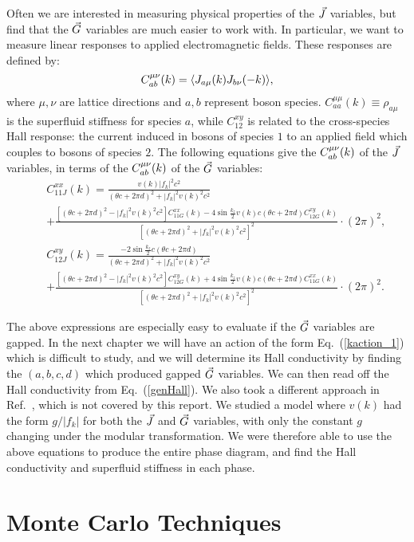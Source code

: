 Often we are interested in measuring physical properties of the $\vec{J}$ variables, but find that the $\vec{G}$ variables are much easier to work with. In particular, we want to measure linear responses to applied electromagnetic fields. These responses are defined by:
\begin{equation}
C^{\mu\nu}_{ab}(k)=\langle J_{a\mu}(k) J_{b\nu}(-k)\rangle,
\end{equation}
where $\mu,\nu$ are lattice directions and $a,b$ represent boson species. $C^{\mu\mu}_{aa}(k)\equiv \rho_{a\mu}$ is the superfluid stiffness for species $a$, while $C^{xy}_{12}$ is related to the cross-species Hall response: the current induced in bosons of species $1$ to an applied field which couples to bosons of species $2$. The following equations give the $C^{\mu\nu}_{ab}(k)$ of the $\vec{J}$ variables, in terms of the $C^{\mu\nu}_{ab}(k)$ of the $\vec{G}$ variables:
\begin{eqnarray}
&&C_{11J}^{xx}(k)=\frac{v(k)|f_k|^2c^2}{(\theta c+2\pi d)^2+|f_k|^2v(k)^2c^2}\\
&&+\frac{[(\theta c+2\pi d)^2-|f_k|^2v(k)^2c^2]C_{11G}^{xx}(k)-4\sin{\frac{k_z}{2}}v(k)c(\theta c+2\pi d)C_{12G}^{xy}(k)}{[(\theta c+2\pi d)^2+|f_k|^2v(k)^2c^2]^2}\cdot (2\pi)^2,\nonumber\\
&&C_{12J}^{xy}(k)=\frac{-2\sin{\frac{k_z}{2}}c(\theta c+2\pi d)}{(\theta c+2\pi d)^2+|f_k|^2v(k)^2c^2}\label{genHall}\\
&&+\frac{[(\theta c+2\pi d)^2-|f_k|^2v(k)^2c^2]C_{12G}^{xy}(k)+4\sin{\frac{k_z}{2}}v(k)c(\theta c+2\pi d)C_{11G}^{xx}(k)}{[(\theta c+2\pi d)^2+|f_k|^2v(k)^2c^2]^2}\cdot (2\pi)^2.\nonumber
\end{eqnarray}

The above expressions are especially easy to evaluate if the $\vec{G}$ variables are gapped. In the next chapter we will have an action of the form Eq.~(\ref{kaction_1}) which is difficult to study, and we will determine its Hall conductivity by finding the $(a,b,c,d)$ which produced gapped $\vec{G}$ variables. We can then read off the Hall conductivity from Eq.~(\ref{genHall}). We also took a different approach in Ref.~\cite{Gen2Loops}, which is not covered by this report. We studied a model where $v(k)$ had the form $g/|f_k|$ for both the $\vec{J}$ and $\vec{G}$ variables, with only the constant $g$ changing under the modular transformation. We were therefore able to use the above equations to produce the entire phase diagram, and find the Hall conductivity and superfluid stiffness in each phase.

\section{Monte Carlo Techniques}

